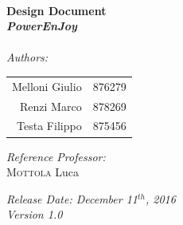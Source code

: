 \begin{titlepage}
\HRule \\[0.4cm]
{ \huge \bfseries Design Document\\[0.5cm]\textit{PowerEnJoy}}\\[0.4cm] %
\HRule \\[1.5cm]
 
\Large \emph{Authors:}\\
\LARGE{
\begin{center}
\begin{tabular}{ r  l }
	Melloni Giulio & 876279\\
	Renzi Marco & 878269\\
	Testa Filippo & 875456 \\
\end{tabular}
\end{center}
}
\vspace*{0.8cm}
\Large{\emph{Reference Professor:} \\
{\textsc{Mottola} Luca} 
}

 \vspace*{1cm}
{\LARGE {\it Release Date: December 11$^{th}$, 2016\\Version 1.0}}

\end{titlepage}